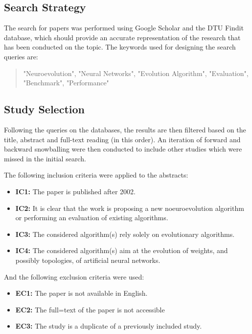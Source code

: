 \subsection{Search Strategy}

The search for papers was performed using Google Scholar and the DTU Findit database, which should provide an accurate representation of the research that has been
conducted on the topic. The keywords used for designing the search queries are:

\begin{quote}
    "Neuroevolution", "Neural Networks", "Evolution Algorithm", "Evaluation", "Benchmark", "Performance"
\end{quote}

\subsection{Study Selection}

Following the queries on the databases, the results are then filtered based on the title, abstract and full-text reading (in this order). An iteration of forward
and backward snowballing were then conducted to include other studies which were missed in the initial search.

The following inclusion criteria were applied to the abstracts:

\begin{itemize}
    \item \textbf{IC1:} The paper is published after 2002.
    \item \textbf{IC2:} It is clear that the work is proposing a new noeuroevolution algorithm or performing an evaluation of existing algorithms.
    \item \textbf{IC3:} The considered algorithm(s) rely solely on evolutionary algorithms.
    \item \textbf{IC4:} The considered algorithm(s) aim at the evolution of weights, and possibly topologies, of artificial neural networks.
\end{itemize}

And the following exclusion criteria were used:

\begin{itemize}
    \item \textbf{EC1:} The paper is not available in English.
    \item \textbf{EC2:} The full=text of the paper is not accessible
    \item \textbf{EC3:} The study is a duplicate of a previously included study.
\end{itemize}

